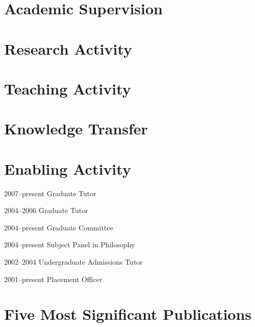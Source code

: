 \documentclass[contbibnum]{cv}
\begin{document}
\section{Academic Supervision} %
\label{sec:academic_supervision}


\section{Research Activity} %
\label{sec:research_activity}


\section{Teaching Activity} %
\label{sec:teaching_activity}


\section{Knowledge Transfer} %
\label{sec:knowledge_transfer}


\section{Enabling Activity} %
\label{sec:enabling_activity}
\begin{topic}
    \item[2007--present] Graduate Tutor
    \item[2004--2006] Graduate Tutor
    \item[2004--present] Graduate Committee
    \item[2004--present] Subject Panel in Philosophy
    \item[2002--2004] Undergraduate Admissions Tutor
    \item[2001--present] Placement Officer
\end{topic}

\section{Five Most Significant Publications} %
\label{sec:five_most_significant_publications}


\nocite{Kalderon:2008qy}
\nocite{Kalderon:2008mi}
\nocite{Kalderon:2008ud}
\nocite{Kalderon:1987lr}
\nocite{Kalderon:1996fk}
\nocite{Kalderon:1997lr}
\nocite{Kalderon:2000qy}
\nocite{Kalderon:2001qf}
\nocite{Kalderon:2004lr}
\nocite{Kalderon:2005gz}
\nocite{Kalderon:2005lr}
\nocite{Kalderon:2006fk}
\nocite{Kalderon:2006tg}
\nocite{Kalderon:2007fk}
\nocite{Kalderon:2007qy}
\nocite{Kalderon:2006fk}
\nocite{Kalderon:2007lr}
\nocite{Kalderon:2007mr}
\nocite{Kalderon:2007gk}
\nocite{Kalderon:2007qy}
\nocite{Skiadas:2007lr}
\nocite{Hilbert:2000on}

 

\end{document}
